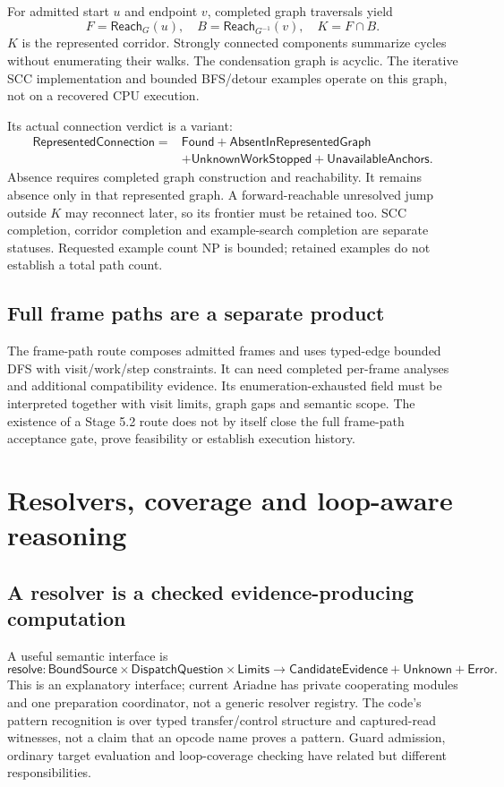 \documentclass[11pt,a4paper]{article}
\newcommand{\ty}[1]{\mathsf{#1}}
\begin{document}
For admitted start $u$ and endpoint $v$, completed graph traversals yield
\[
 F=\ty{Reach}_G(u),\quad
 B=\ty{Reach}_{G^{-1}}(v),\quad
 K=F\cap B.
\]
$K$ is the represented corridor. Strongly connected components summarize
cycles without enumerating their walks. The condensation graph is acyclic.
The iterative SCC implementation and bounded BFS/detour examples operate on
this graph, not on a recovered CPU execution.

Its actual connection verdict is a variant:
\[
\begin{aligned}
\ty{RepresentedConnection}={}&\ty{Found}+\ty{AbsentInRepresentedGraph}\\
 &+\ty{UnknownWorkStopped}+\ty{UnavailableAnchors}.
\end{aligned}
\]
Absence requires completed graph construction and reachability. It remains
absence only in that represented graph. A forward-reachable unresolved jump
outside $K$ may reconnect later, so its frontier must be retained too.
SCC completion, corridor completion and example-search completion are separate
statuses. Requested example count NP is bounded; retained examples do not
establish a total path count.

\subsection{Full frame paths are a separate product}
The frame-path route composes admitted frames and uses typed-edge bounded
DFS with visit/work/step constraints. It can need completed per-frame analyses
and additional compatibility evidence. Its enumeration-exhausted field must
be interpreted together with visit limits, graph gaps and semantic scope.
The existence of a Stage 5.2 route does not by itself close the full frame-path
acceptance gate, prove feasibility or establish execution history.

\section{Resolvers, coverage and loop-aware reasoning}
\label{app:resolvers}
\subsection{A resolver is a checked evidence-producing computation}
A useful semantic interface is
\[
 \ty{resolve}:\ty{BoundSource}\times\ty{DispatchQuestion}\times\ty{Limits}
 \to\ty{CandidateEvidence}+\ty{Unknown}+\ty{Error}.
\]
This is an explanatory interface; current Ariadne has private cooperating
modules and one preparation coordinator, not a generic resolver registry.
The code's pattern recognition is over typed transfer/control structure and
captured-read witnesses, not a claim that an opcode name proves a pattern.
Guard admission, ordinary target evaluation and loop-coverage checking have
related but different responsibilities.
\end{document}
